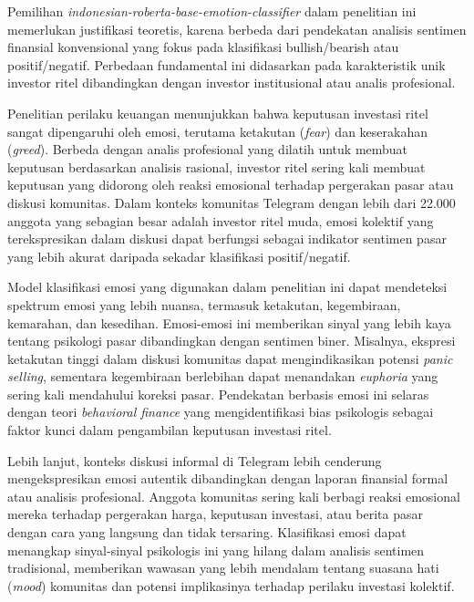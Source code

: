Pemilihan \textit{indonesian-roberta-base-emotion-classifier} dalam penelitian ini memerlukan justifikasi teoretis, karena berbeda dari pendekatan analisis sentimen finansial konvensional yang fokus pada klasifikasi bullish/bearish atau positif/negatif. Perbedaan fundamental ini didasarkan pada karakteristik unik investor ritel dibandingkan dengan investor institusional atau analis profesional.

Penelitian perilaku keuangan menunjukkan bahwa keputusan investasi ritel sangat dipengaruhi oleh emosi, terutama ketakutan (\textit{fear}) dan keserakahan (\textit{greed}). Berbeda dengan analis profesional yang dilatih untuk membuat keputusan berdasarkan analisis rasional, investor ritel sering kali membuat keputusan yang didorong oleh reaksi emosional terhadap pergerakan pasar atau diskusi komunitas. Dalam konteks komunitas Telegram dengan lebih dari 22.000 anggota yang sebagian besar adalah investor ritel muda, emosi kolektif yang terekspresikan dalam diskusi dapat berfungsi sebagai indikator sentimen pasar yang lebih akurat daripada sekadar klasifikasi positif/negatif.

Model klasifikasi emosi yang digunakan dalam penelitian ini dapat mendeteksi spektrum emosi yang lebih nuansa, termasuk ketakutan, kegembiraan, kemarahan, dan kesedihan. Emosi-emosi ini memberikan sinyal yang lebih kaya tentang psikologi pasar dibandingkan dengan sentimen biner. Misalnya, ekspresi ketakutan tinggi dalam diskusi komunitas dapat mengindikasikan potensi \textit{panic selling}, sementara kegembiraan berlebihan dapat menandakan \textit{euphoria} yang sering kali mendahului koreksi pasar. Pendekatan berbasis emosi ini selaras dengan teori \textit{behavioral finance} yang mengidentifikasi bias psikologis sebagai faktor kunci dalam pengambilan keputusan investasi ritel.

Lebih lanjut, konteks diskusi informal di Telegram lebih cenderung mengekspresikan emosi autentik dibandingkan dengan laporan finansial formal atau analisis profesional. Anggota komunitas sering kali berbagi reaksi emosional mereka terhadap pergerakan harga, keputusan investasi, atau berita pasar dengan cara yang langsung dan tidak tersaring. Klasifikasi emosi dapat menangkap sinyal-sinyal psikologis ini yang hilang dalam analisis sentimen tradisional, memberikan wawasan yang lebih mendalam tentang suasana hati (\textit{mood}) komunitas dan potensi implikasinya terhadap perilaku investasi kolektif.

